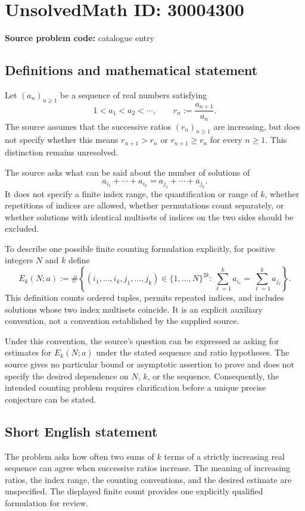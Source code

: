 \documentclass[11pt]{article}
\begin{document}
\section*{UnsolvedMath ID: 30004300}
\textbf{Source problem code:} catalogue entry
\subsection{Definitions and mathematical statement}
Let \((a_n)_{n\geq 1}\) be a sequence of real numbers satisfying
\[
1<a_1<a_2<\cdots,
\qquad r_n:=\frac{a_{n+1}}{a_n}.
\]
The source assumes that the successive ratios \((r_n)_{n\geq 1}\) are increasing, but does not specify whether this means \(r_{n+1}>r_n\) or \(r_{n+1}\geq r_n\) for every \(n\geq 1\). This distinction remains unresolved.

The source asks what can be said about the number of solutions of
\[
a_{i_1}+\cdots+a_{i_k}=a_{j_1}+\cdots+a_{j_k}.
\]
It does not specify a finite index range, the quantification or range of \(k\), whether repetitions of indices are allowed, whether permutations count separately, or whether solutions with identical multisets of indices on the two sides should be excluded.

To describe one possible finite counting formulation explicitly, for positive integers \(N\) and \(k\) define
\[
E_k(N;a):=
\#\left\{
(i_1,\ldots,i_k,j_1,\ldots,j_k)\in\{1,\ldots,N\}^{2k}:
\sum_{\ell=1}^{k}a_{i_\ell}=\sum_{\ell=1}^{k}a_{j_\ell}
\right\}.
\]
This definition counts ordered tuples, permits repeated indices, and includes solutions whose two index multisets coincide. It is an explicit auxiliary convention, not a convention established by the supplied source.

Under this convention, the source's question can be expressed as asking for estimates for \(E_k(N;a)\) under the stated sequence and ratio hypotheses. The source gives no particular bound or asymptotic assertion to prove and does not specify the desired dependence on \(N\), \(k\), or the sequence. Consequently, the intended counting problem requires clarification before a unique precise conjecture can be stated.
\subsection{Short English statement}
The problem asks how often two sums of \(k\) terms of a strictly increasing real sequence can agree when successive ratios increase. The meaning of increasing ratios, the index range, the counting conventions, and the desired estimate are unspecified. The displayed finite count provides one explicitly qualified formulation for review.
\end{document}
